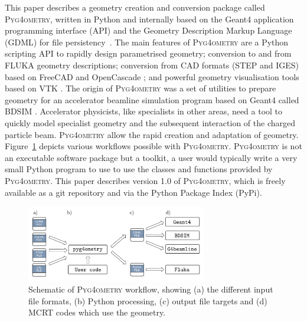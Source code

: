 \documentclass[final,5p,times,twocolumn]{elsarticle}
\newcommand{\PYGEOMETRY}{\textsc{Pyg4ometry}}
\begin{document}
This paper describes a geometry creation and conversion package called \PYGEOMETRY{}, written in Python and internally based on the Geant4 application 
programming interface (API) and the Geometry Description Markup Language (GDML) for file persistency~\cite{GDML}. The main features of \PYGEOMETRY{} 
are a Python scripting API to rapidly design parametrised geometry; conversion to and from  FLUKA geometry descriptions; conversion from CAD formats  (STEP 
and IGES) based on FreeCAD \cite{FreeCAD} and OpenCascade \cite{OpenCASCADE}; and powerful geometry visualisation tools based on VTK \cite{VTK4}. The 
origin of \PYGEOMETRY{} was a set of utilities to prepare geometry for an accelerator beamline simulation program based on Geant4 called BDSIM \cite{BDSIM_Nevay}. 
Accelerator physicists, like specialists in other areas, need a tool to quickly model specialist geometry and the subsequent interaction of the charged particle beam. 
\PYGEOMETRY{} allow the rapid creation and adaptation of geometry. Figure~\ref{fig:workflow} depicts various workflows possible with \PYGEOMETRY{}. \PYGEOMETRY{} 
is not an executable software package but a toolkit, a user would typically write a very small Python program to use to use the classes and functions provided by 
\PYGEOMETRY{}. This paper describes version 1.0 of \PYGEOMETRY{}, which is freely available as a git repository and via the Python Package Index (PyPi).

\begin{figure}[hbt!]
  \normalsize
  \centering
  \includegraphics[width=0.7\textwidth]{./diagrams/workflow.pdf}
  \caption{\label{fig:workflow}Schematic of \PYGEOMETRY{} workflow, showing (a) the different input file formats, (b) Python processing, (c) output file targets and 
  (d) MCRT codes which use the geometry. }
\end{figure}
\end{document}
